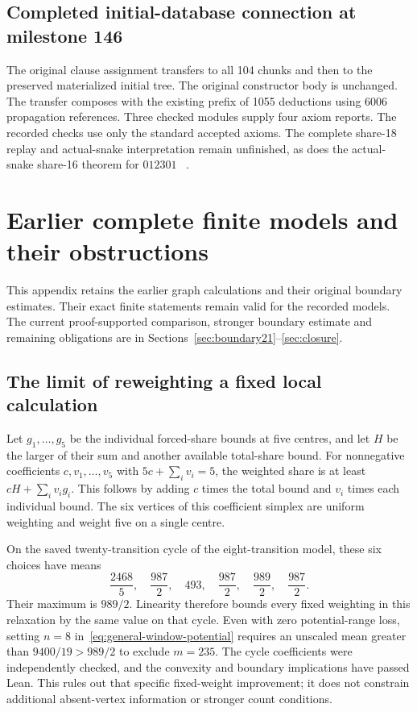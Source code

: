 \documentclass[11pt,a4paper]{article}
\theoremstyle{definition}
\theoremstyle{remark}
\begin{document}
\subsection{Completed initial-database connection at milestone 146}
The original clause assignment transfers to all 104 chunks and then to the
preserved materialized initial tree. The original constructor body is
unchanged. The transfer composes with the existing prefix of 1055 deductions
using 6006 propagation references. Three checked modules supply four axiom
reports. The recorded checks use only the standard accepted axioms.
The complete share-18 replay and actual-snake interpretation remain
unfinished, as does the actual-snake share-16 theorem for $012301$
~\cite{bridge146archive}.

\section{Earlier complete finite models and their obstructions}\label{app:earlier-long-models}
This appendix retains the earlier graph calculations and their original boundary estimates. Their exact finite statements remain valid for the recorded models. The current proof-supported comparison, stronger boundary estimate and remaining obligations are in Sections~\ref{sec:boundary21}--\ref{sec:closure}.

\subsection{The limit of reweighting a fixed local calculation}
Let $g_1,\ldots,g_5$ be the individual forced-share bounds at five centres, and let $H$ be the larger of their sum and another available total-share bound. For nonnegative coefficients $c,v_1,\ldots,v_5$ with $5c+\sum_i v_i=5$, the weighted share is at least $cH+\sum_i v_i g_i$. This follows by adding $c$ times the total bound and $v_i$ times each individual bound. The six vertices of this coefficient simplex are uniform weighting and weight five on a single centre.

On the saved twenty-transition cycle of the eight-transition model, these six choices have means
\[
\frac{2468}{5},\quad\frac{987}{2},\quad493,\quad
\frac{987}{2},\quad\frac{989}{2},\quad\frac{987}{2}.
\]
Their maximum is $989/2$. Linearity therefore bounds every fixed weighting in this relaxation by the same value on that cycle. Even with zero potential-range loss, setting $n=8$ in~\eqref{eq:general-window-potential} requires an unscaled mean greater than $9400/19>989/2$ to exclude $m=235$. The cycle coefficients were independently checked, and the convexity and boundary implications have passed Lean. This rules out that specific fixed-weight improvement; it does not constrain additional absent-vertex information or stronger count conditions.
\end{document}
